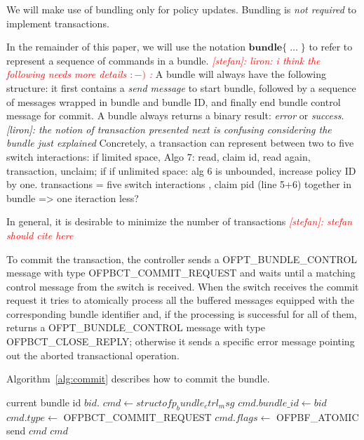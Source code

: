 \documentclass[conference]{sigcomm-alternate}
\newcommand{\stefan}[1]{\textit{\textcolor{red}{[stefan]: #1}}} %
\newcommand{\liron}[1]{\textit{\textcolor{mygreen}{[liron]: #1}}} %
\begin{document}
We will make use of bundling only for policy updates. 
Bundling is \emph{not required} to implement transactions.

In the remainder of this paper, we will use the notation 
$\textbf{bundle}\{\;\ldots\;\}$ to refer to represent a
sequence of commands in a bundle.
\stefan{liron: i think the following needs more details $:-)$ :} A bundle will always have the following structure:
it first contains a \emph{send message} to start bundle,
followed by a sequence of messages wrapped in bundle and bundle ID, 
and finally end bundle control message for commit.
A bundle always returns a binary result: \emph{error} or \emph{success}.
\liron{the notion of transaction presented next is confusing considering the bundle just explained}
Concretely, a transaction can represent between two to five switch interactions:
if limited space, Algo 7: read, claim id, read again, transaction, unclaim;
if if unlimited space: alg 6 is unbounded, increase policy ID by one.
transactions = five switch interactions , claim pid (line 5+6) together in bundle => one iteraction less?

In general, it is desirable to minimize the number of transactions \stefan{stefan should cite \cite{Jin2014Dionysus} here}


To commit the transaction,  the controller sends a \textsf{OFPT\_BUNDLE\_CONTROL} message with type
\textsf{OFPBCT\_COMMIT\_REQUEST} and waits until a matching control
message from the switch is received. When the switch receives the
commit request it tries to atomically process all the buffered messages
equipped with the corresponding bundle identifier and, if the
processing is successful for all of them, returns  a \textsf{OFPT\_BUNDLE\_CONTROL} message with type
\textsf{OFPBCT\_CLOSE\_REPLY}; otherwise it sends a specific error
message  pointing out the aborted transactional operation.

Algorithm~\ref{alg:commit} describes how to commit
the bundle. 
\begin{algorithm}[h]
    \caption{$\textit{try-commit}()$}
    \label{alg:commit}
    \begin{algorithmic}[1]
    \Require  current bundle id $bid$.
		    \State $cmd \gets struct ofp_bundle_ctrl_msg$
    		\State  $cmd.bundle\_id \gets bid$
    		\State  $cmd.type \gets $ \textsf{OFPBCT\_COMMIT\_REQUEST}
    		\State  $cmd.flags \gets $ \textsf{OFPBF\_ATOMIC}
    		\State send $cmd$
		\Return $cmd$
    \end{algorithmic}
\end{algorithm}
\end{document}
